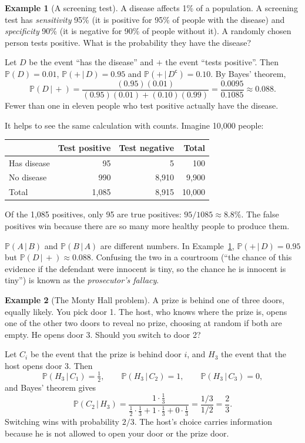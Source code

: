 \documentclass[11pt,letterpaper]{article}
\theoremstyle{definition}
\newtheorem{example}{Example}
\theoremstyle{plain}
\newcommand{\Prob}{\mathbb{P}}
\newcommand{\given}{\,\vert\,}
\newcommand{\comp}{^{\mathsf{c}}}
\begin{document}
\begin{example}[A screening test]\label{ex:screening}
A disease affects 1\% of a population. A screening test has \emph{sensitivity} 95\% (it is positive for 95\% of people with the disease) and \emph{specificity} 90\% (it is negative for 90\% of people without it). A randomly chosen person tests positive. What is the probability they have the disease?

Let $D$ be the event ``has the disease'' and $+$ the event ``tests positive''. Then $\Prob(D) = 0.01$, $\Prob(+ \given D) = 0.95$ and $\Prob(+ \given D\comp) = 0.10$. By Bayes' theorem,
\[
  \Prob(D \given +) = \frac{(0.95)(0.01)}{(0.95)(0.01) + (0.10)(0.99)} = \frac{0.0095}{0.1085} \approx 0.088.
\]
Fewer than one in eleven people who test positive actually have the disease.

It helps to see the same calculation with counts. Imagine 10{,}000 people:

\begin{center}
\begin{tabular}{@{}lrrr@{}}
  \toprule
  & Test positive & Test negative & Total \\
  \midrule
  Has disease     & 95    & 5     & 100    \\
  No disease      & 990   & 8{,}910 & 9{,}900 \\
  \midrule
  Total           & 1{,}085 & 8{,}915 & 10{,}000 \\
  \bottomrule
\end{tabular}
\end{center}

Of the 1{,}085 positives, only 95 are true positives: $95/1085 \approx 8.8\%$. The false positives win because there are so many more healthy people to produce them.
\end{example}

\begin{pitfall}
$\Prob(A \given B)$ and $\Prob(B \given A)$ are different numbers. In Example~\ref{ex:screening}, $\Prob(+ \given D) = 0.95$ but $\Prob(D \given +) \approx 0.088$. Confusing the two in a courtroom (``the chance of this evidence if the defendant were innocent is tiny, so the chance he is innocent is tiny'') is known as the \emph{prosecutor's fallacy}.
\end{pitfall}

\begin{example}[The Monty Hall problem]
A prize is behind one of three doors, equally likely. You pick door 1. The host, who knows where the prize is, opens one of the other two doors to reveal no prize, choosing at random if both are empty. He opens door 3. Should you switch to door 2?

Let $C_i$ be the event that the prize is behind door $i$, and $H_3$ the event that the host opens door 3. Then
\[
  \Prob(H_3 \given C_1) = \tfrac12, \qquad \Prob(H_3 \given C_2) = 1, \qquad \Prob(H_3 \given C_3) = 0,
\]
and Bayes' theorem gives
\[
  \Prob(C_2 \given H_3) = \frac{1 \cdot \frac13}{\frac12\cdot\frac13 + 1\cdot\frac13 + 0\cdot\frac13} = \frac{1/3}{1/2} = \frac23.
\]
Switching wins with probability $2/3$. The host's choice carries information because he is not allowed to open your door or the prize door.
\end{example}
\end{document}
